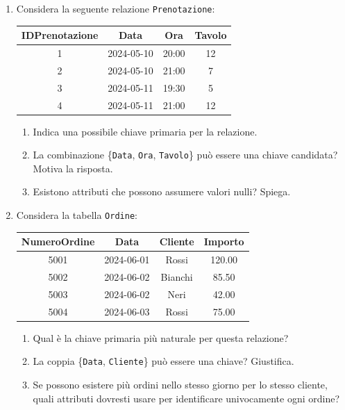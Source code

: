\documentclass[a4paper,12pt]{article}
\begin{document}
\begin{enumerate}
\vspace{0.5cm}

\item 

Considera la seguente relazione \texttt{Prenotazione}:
\begin{center}
\begin{tabular}{|c|c|c|c|}
\hline
\textbf{IDPrenotazione} & \textbf{Data} & \textbf{Ora} & \textbf{Tavolo} \\
\hline
1 & 2024-05-10 & 20:00 & 12 \\
2 & 2024-05-10 & 21:00 & 7 \\
3 & 2024-05-11 & 19:30 & 5 \\
4 & 2024-05-11 & 21:00 & 12 \\
\hline
\end{tabular}
\end{center}

\begin{enumerate}
    \item Indica una possibile chiave primaria per la relazione.
    \item La combinazione \{\texttt{Data}, \texttt{Ora}, \texttt{Tavolo}\} può essere una chiave candidata? Motiva la risposta.
    \item Esistono attributi che possono assumere valori nulli? Spiega.
\end{enumerate}

\vspace{0.5cm}

\item 

Considera la tabella \texttt{Ordine}:
\begin{center}
\begin{tabular}{|c|c|c|c|}
\hline
\textbf{NumeroOrdine} & \textbf{Data} & \textbf{Cliente} & \textbf{Importo} \\
\hline
5001 & 2024-06-01 & Rossi & 120.00 \\
5002 & 2024-06-02 & Bianchi & 85.50 \\
5003 & 2024-06-02 & Neri & 42.00 \\
5004 & 2024-06-03 & Rossi & 75.00 \\
\hline
\end{tabular}
\end{center}

\begin{enumerate}
    \item Qual è la chiave primaria più naturale per questa relazione?
    \item La coppia \{\texttt{Data}, \texttt{Cliente}\} può essere una chiave? Giustifica.
    \item Se possono esistere più ordini nello stesso giorno per lo stesso cliente, quali attributi dovresti usare per identificare univocamente ogni ordine?
\end{enumerate}


\end{enumerate}
\end{document}
